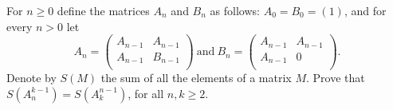For \( n\geq 0\) define the matrices \( A_n\) and \( B_n\) as follows: \( A_0 = B_0 = (1)\), and for every \( n>0\) let
\[ A_n = \left( \begin{array}{cc} A_{n - 1} & A_{n - 1} \\
A_{n - 1} & B_{n - 1} \\
\end{array} \right) \ \textrm{and} \ B_n = \left( \begin{array}{cc} A_{n - 1} & A_{n - 1} \\
A_{n - 1} & 0 \\
\end{array} \right).
\]
Denote by \( S(M)\) the sum of all the elements of a matrix \( M\). Prove that \( S(A_n^{k - 1}) = S(A_k^{n - 1})\), for all \( n,k\geq 2\).